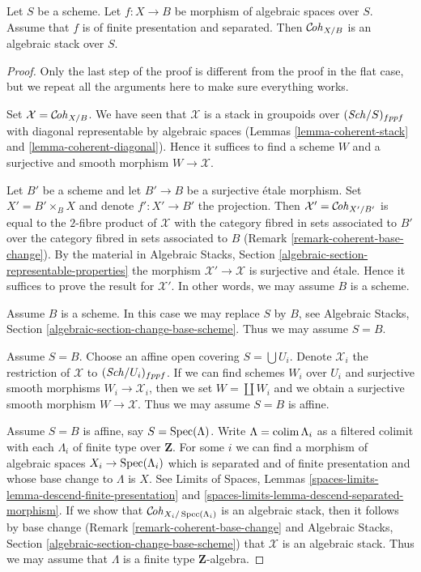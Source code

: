 \begin{theorem}
\label{theorem-coherent-algebraic-general}
Let $S$ be a scheme. Let $f : X \to B$ be morphism of algebraic spaces
over $S$. Assume that $f$ is of finite presentation and separated. Then
$\mathcal{C}\!\mathit{oh}_{X/B}$ is an algebraic stack over $S$.
\end{theorem}

\begin{proof}
Only the last step of the proof is different from the proof
in the flat case, but we repeat all the arguments here to make 
sure everything works.

\medskip\noindent
Set $\mathcal{X} = \mathcal{C}\!\mathit{oh}_{X/B}$. We have seen that $\mathcal{X}$
is a stack in groupoids over $(\mathit{Sch}/S)_{fppf}$ with diagonal representable
by algebraic spaces
(Lemmas \ref{lemma-coherent-stack} and \ref{lemma-coherent-diagonal}).
Hence it suffices to find a scheme $W$ and a surjective and smooth
morphism $W \to \mathcal{X}$.

\medskip\noindent
Let $B'$ be a scheme and let $B' \to B$ be a surjective \'etale morphism.
Set $X' = B' \times_B X$ and denote $f' : X' \to B'$ the projection.
Then $\mathcal{X}' = \mathcal{C}\!\mathit{oh}_{X'/B'}$ is equal to the $2$-fibre
product of $\mathcal{X}$ with the category fibred in sets
associated to $B'$ over the category fibred in sets associated to $B$
(Remark \ref{remark-coherent-base-change}). By the material in
Algebraic Stacks, Section \ref{algebraic-section-representable-properties}
the morphism $\mathcal{X}' \to \mathcal{X}$ is surjective and \'etale.
Hence it suffices to prove the result for $\mathcal{X}'$.
In other words, we may assume $B$ is a scheme.

\medskip\noindent
Assume $B$ is a scheme. In this case we may replace $S$ by $B$, see
Algebraic Stacks, Section \ref{algebraic-section-change-base-scheme}.
Thus we may assume $S = B$.

\medskip\noindent
Assume $S = B$. Choose an affine open covering $S = \bigcup U_i$.
Denote $\mathcal{X}_i$ the restriction of $\mathcal{X}$ to
$(\mathit{Sch}/U_i)_{fppf}$. If we can find schemes $W_i$ over $U_i$ and
surjective smooth morphisms $W_i \to \mathcal{X}_i$, then we
set $W = \coprod W_i$ and we obtain a surjective smooth morphism
$W \to \mathcal{X}$. Thus we may assume $S = B$ is affine.

\medskip\noindent
Assume $S = B$ is affine, say $S = \mathop{\mathrm{Spec}}(\Lambda)$.
Write $\Lambda = \mathop{\mathrm{colim}}\nolimits \Lambda_i$ as a filtered colimit with each $\Lambda_i$
of finite type over $\mathbf{Z}$. For some $i$ we can find
a morphism of algebraic spaces $X_i \to \mathop{\mathrm{Spec}}(\Lambda_i)$
which is separated and of finite presentation and whose base change
to $\Lambda$ is $X$. See Limits of Spaces, Lemmas
\ref{spaces-limits-lemma-descend-finite-presentation} and
\ref{spaces-limits-lemma-descend-separated-morphism}.
If we show that $\mathcal{C}\!\mathit{oh}_{X_i/\mathop{\mathrm{Spec}}(\Lambda_i)}$ is an
algebraic stack, then it follows by base change
(Remark \ref{remark-coherent-base-change} and
Algebraic Stacks, Section \ref{algebraic-section-change-base-scheme})
that $\mathcal{X}$ is an algebraic stack.
Thus we may assume that $\Lambda$ is a finite type $\mathbf{Z}$-algebra.


\end{proof}
